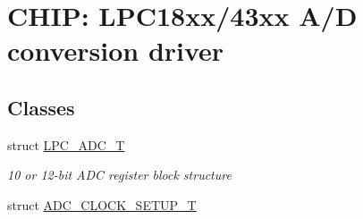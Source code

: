 \hypertarget{group___a_d_c__18_x_x__43_x_x}{}\section{C\+H\+IP\+: L\+P\+C18xx/43xx A/D conversion driver}
\label{group___a_d_c__18_x_x__43_x_x}
\subsection*{Classes}
\begin{DoxyCompactItemize}
\item 
struct \hyperlink{struct_l_p_c___a_d_c___t}{L\+P\+C\+\_\+\+A\+D\+C\+\_\+T}
\begin{DoxyCompactList}\small\item\em 10 or 12-\/bit A\+DC register block structure \end{DoxyCompactList}\item 
struct \hyperlink{struct_a_d_c___c_l_o_c_k___s_e_t_u_p___t}{A\+D\+C\+\_\+\+C\+L\+O\+C\+K\+\_\+\+S\+E\+T\+U\+P\+\_\+T}
\end{DoxyCompactItemize}

